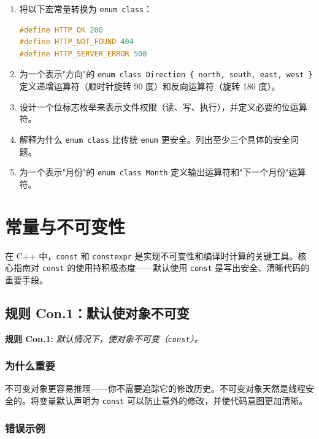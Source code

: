 \begin{enumerate}
  \item 将以下宏常量转换为 \texttt{enum class}：
\begin{lstlisting}[language=C++]
#define HTTP_OK 200
#define HTTP_NOT_FOUND 404
#define HTTP_SERVER_ERROR 500
\end{lstlisting}
  \item 为一个表示"方向"的 \texttt{enum class Direction \{ north, south, east, west \}} 定义递增运算符（顺时针旋转 90 度）和反向运算符（旋转 180 度）。
  \item 设计一个位标志枚举来表示文件权限（读、写、执行），并定义必要的位运算符。
  \item 解释为什么 \texttt{enum class} 比传统 \texttt{enum} 更安全。列出至少三个具体的安全问题。
  \item 为一个表示"月份"的 \texttt{enum class Month} 定义输出运算符和"下一个月份"运算符。
\end{enumerate}


\chapter{常量与不可变性}

在 C++ 中，\texttt{const} 和 \texttt{constexpr} 是实现不可变性和编译时计算的关键工具。核心指南对 \texttt{const} 的使用持积极态度——默认使用 \texttt{const} 是写出安全、清晰代码的重要手段。

\section{规则 Con.1：默认使对象不可变}

\textbf{规则 Con.1:} \textit{默认情况下，使对象不可变（\texttt{const}）。}

\subsection{为什么重要}

不可变对象更容易推理——你不需要追踪它的修改历史。不可变对象天然是线程安全的。将变量默认声明为 \texttt{const} 可以防止意外的修改，并使代码意图更加清晰。

\subsection{错误示例}

